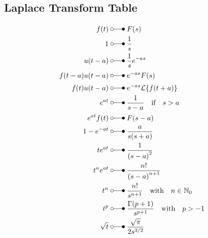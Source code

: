 \subsection{Laplace Transform Table}
\begin{align*}
    f(t)                            \;                      & \laplace\; F(s)                                                               \\
    1                               \;                      & \laplace\; \frac{1}{s}                                                        \\
    u(t-a)                          \;                      & \laplace\; \frac{1}{s}e^{-as}                                                 \\
    f(t-a)u(t-a)                    \;                      & \laplace\; e^{-as}F(s)                                                        \\
    f(t)u(t-a)                      \;                      & \laplace\; e^{-as}\mathcal{L}\{f(t+a)\}                                       \\
    e^{at}                          \;                      & \laplace\; \frac{1}{s-a} \quad \text{if} \quad s>a \;                         \\
    e^{at}f(t)                      \;                      & \laplace\; F(s-a)                                                             \\
    1-e^{-at}                       \;                      & \laplace\; \frac{a}{s(s+a)}                                                   \\
    te^{at}                         \;                      & \laplace\; \frac{1}{{(s-a)}^2}                                                \\
    t^{n}e^{at}                     \;                      & \laplace\; \frac{n!}{{(s-a)}^{n+1}}                                           \\
    t^{n}                           \;                      & \laplace\; \frac{n!}{s^{n+1}} \quad \text{with} \quad n \in \mathbb{N}_0      \\
    t^{p}                           \;                      & \laplace\; \frac{\Gamma(p+1)}{s^{p+1}} \quad \text{with} \quad p > -1         \\
    \sqrt{t}                        \;                      & \laplace\; \frac{\sqrt{\pi}}{2{s}^{3/2}}                                      \\

\end{align*}
